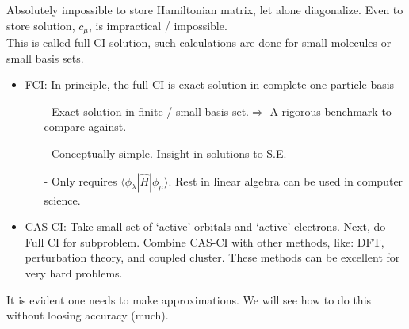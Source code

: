\documentclass[a4paper, 12pt]{article}
\begin{document}
Absolutely impossible to store Hamiltonian matrix, let alone diagonalize. Even to store solution, $c_\mu$, is impractical / impossible.\\

This is called full CI solution, such calculations are done for small molecules or small basis sets.
\begin{itemize}
	\item FCI: In principle, the full CI is exact solution in complete one-particle basis
\begin{itemize}
\item [-] Exact solution in finite / small basis set.$\Longrightarrow$ A rigorous benchmark to compare against.
\item [-] Conceptually simple. Insight in solutions to S.E.
\item [-] Only requires $\langle \phi_\lambda |\hat{H}|\phi_\mu\rangle$. Rest in linear algebra can be used in computer science.
\end{itemize}
	\item CAS-CI: Take small set of `active' orbitals and `active' electrons. Next, do Full CI for subproblem. Combine CAS-CI with other methods, like: DFT, perturbation theory, and coupled cluster. These methods can be excellent for very hard problems.
\end{itemize}
It is evident one needs to make approximations. We will see how to do this without loosing accuracy (much).
\end{document}
